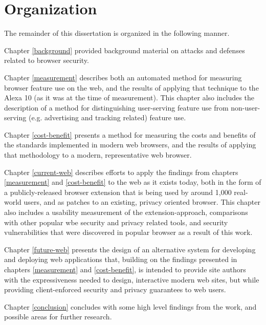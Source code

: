 \section{Organization}
\label{intro:organization}

The remainder of this dissertation is organized in the following manner.

Chapter \ref{background} provided background material on attacks and defenses
related to browser security.

Chapter \ref{measurement} describes both an automated method for measuring
browser feature use on the web, and the results of applying that technique
to the Alexa 10 (as it was at the time of measurement).  This chapter
also includes the description of a method for distinguishing user-serving
feature use from non-user-serving (e.g. advertising and tracking related)
feature use.

Chapter \ref{cost-benefit} presents a method for measuring the costs and
benefits of the \WAPI standards implemented in modern web browsers, and
the results of applying that methodology to a modern, representative web
browser.

Chapter \ref{current-web} describes efforts to apply the findings from
chapters \ref{measurement} and \ref{cost-benefit} to the web as it exists today,
both in the form of a publicly-released browser extension that is being
used by around 1,000 real-world users, and as patches to an existing, privacy
oriented browser.  This chapter also includes a usability measurement of the
extension-approach, comparisons with other popular wbe security and privacy
related tools, and security vulnerabilities that were discovered in popular
browser as a result of this work.

Chapter \ref{future-web} presents the design of an alternative system for developing
and deploying web applications that, building on the findings presented in
chapters \ref{measurement} and \ref{cost-benefit}, is intended to provide
site authors with the expressiveness needed to design, interactive modern web
sites, but while providing client-enforced security and privacy guarantees to
web users.

Chapter \ref{conclusion} concludes with some high level findings from the
work, and possible areas for further research.
